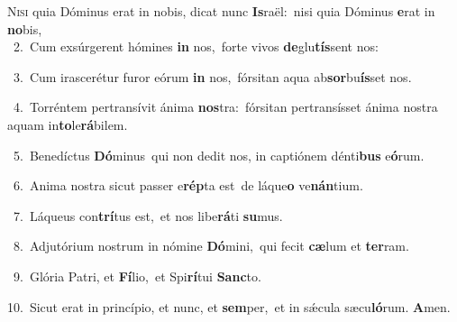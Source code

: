 \lettrine{\initial\textcolor{\initialcolor}{N}}{isi} quia Dóminus erat in nobis, dicat nunc \textbf{Is}\-raël:~\star nisi quia Dóminus \textbf{e}\-rat in \textbf{no}\-bis,\\
{\numbfont\textcolor{\numbcolor}{~2.}}~Cum exsúrgerent hómines \textbf{in} nos,~\star forte vivos \textbf{de}\-glu\-\textbf{tís}\-sent nos:\par
{\numbfont\textcolor{\numbcolor}{~3.}}~Cum irascerétur furor eórum \textbf{in} nos,~\star fórsitan aqua ab\-\textbf{sor}\-bu\-\textbf{ís}\-set nos.\par
{\numbfont\textcolor{\numbcolor}{~4.}}~Torréntem pertransívit ánima \textbf{nos}\-tra:~\star fórsitan pertransísset ánima nostra aquam in\-\textbf{to}\-le\-\textbf{rá}\-bilem.\par
{\numbfont\textcolor{\numbcolor}{~5.}}~Benedíctus \textbf{Dó}\-minus~\star qui non dedit nos, in captiónem dénti\textbf{bus} e\-\textbf{ó}\-rum.\par
{\numbfont\textcolor{\numbcolor}{~6.}}~Anima nostra sicut passer e\-\textbf{rép}\-ta est~\star de láque\textbf{o} ve\-\textbf{nán}\-tium.\par
{\numbfont\textcolor{\numbcolor}{~7.}}~Láqueus con\-\textbf{trí}\-tus est,~\star et nos libe\-\textbf{rá}\-ti \textbf{su}\-mus.\par
{\numbfont\textcolor{\numbcolor}{~8.}}~Adjutórium nostrum in nómine \textbf{Dó}\-mini,~\star qui fecit \textbf{cæ}\-lum et \textbf{ter}\-ram.\par
{\numbfont\textcolor{\numbcolor}{~9.}}~Glória Patri, et \textbf{Fí}\-lio,~\star et Spi\-\textbf{rí}\-tui \textbf{Sanc}\-to.\par
{\numbfont\textcolor{\numbcolor}{10.}}~Sicut erat in princípio, et nunc, et \textbf{sem}\-per,~\star et in sǽcula sæcu\-\textbf{ló}\-rum. \textbf{A}\-men.\par
